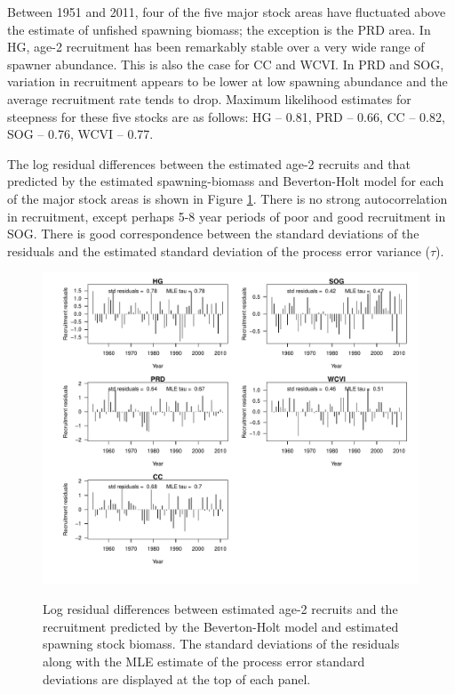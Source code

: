 Between 1951 and 2011, four of the five major stock areas have fluctuated above the estimate of unfished spawning biomass; the exception is the PRD area.  In HG, age-2 recruitment has been remarkably stable over a very wide range of spawner abundance. This is also the case for CC and WCVI.  In PRD and SOG, variation in recruitment appears to be lower at low spawning abundance and the average recruitment rate tends to drop.  Maximum likelihood estimates for steepness for these five stocks are as follows: HG -- 0.81, PRD -- 0.66, CC -- 0.82, SOG -- 0.76, WCVI -- 0.77.

The log residual differences between the estimated age-2 recruits and that predicted by the estimated spawning-biomass and Beverton-Holt model for each of the major stock areas is shown in Figure \ref{PartII:Results:RecResiduals}.  There is no strong autocorrelation in recruitment, except perhaps 5-8 year periods of poor and good recruitment in SOG.  There is good correspondence between the standard deviations of the residuals and the estimated standard deviation of the process error variance ($\tau$).

\begin{figure}[!tbp]
	\includegraphics[width=\textwidth]{../FIGS/qPriorFigs/iscam_fig_recresid.pdf}\\
	\caption{Log residual differences between estimated age-2 recruits and the recruitment predicted by the Beverton-Holt model and estimated spawning stock biomass.  The standard deviations of the residuals along with the MLE estimate of the process error standard deviations are displayed at the top of each panel.}\label{PartII:Results:RecResiduals}
\end{figure}



